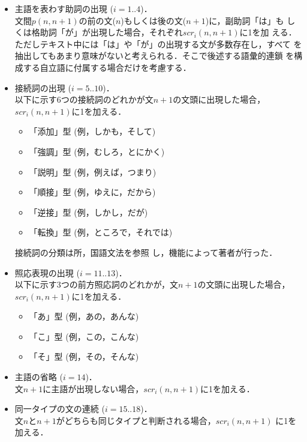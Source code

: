 \begin{itemize}
\item 主語を表わす助詞の出現 ($i=1..4$)．\\
	文間$p(n,n+1)$の前の文($n$)もしくは後の文($n+1$)に，副助詞「は」も
	しくは格助詞「が」が出現した場合，それぞれ$scr_{i}(n,n+1)$に1を加
	える．
	ただしテキスト中には「は」や「が」の出現する文が多数存在し，すべて
	を抽出してもあまり意味がないと考えられる．そこで後述する語彙的連鎖
	を構成する自立語に付属する場合だけを考慮する．

\item 接続詞の出現 ($i=5..10$)．\\
	以下に示す6つの接続詞のどれかが文$n+1$の文頭に出現した場合，
	$scr_{i}(n,n+1)$に1を加える．
	\begin{itemize}
	\item 「添加」型 (例，しかも，そして)
	\item 「強調」型 (例，むしろ，とにかく)
	\item 「説明」型 (例，例えば，つまり)
	\item 「順接」型 (例，ゆえに，だから)
	\item 「逆接」型 (例，しかし，だが)
	\item 「転換」型 (例，ところで，それでは)
	\end{itemize}

	接続詞の分類は所\cite{tokoro}，国語文法\cite{kougobunpou}を参照
	し，機能によって著者が行った．

\item 照応表現の出現 ($i=11..13$)．\\
	以下に示す3つの前方照応詞のどれかが，文$n+1$の文頭に出現した場合，
	$scr_{i}(n,n+1)$に1を加える．

	\begin{itemize}
	\item 「あ」型 (例，あの，あんな)
	\item 「こ」型 (例，この，こんな)
	\item 「そ」型 (例，その，そんな)
	\end{itemize}

\item 主語の省略 ($i=14$)．\\
	文$n+1$に主語が出現しない場合，$scr_{i}(n,n+1)$に1を加える．

\item 同一タイプの文の連続 ($i=15..18$)．\\
	文$n$と$n+1$がどちらも同じタイプと判断される場合，$scr_{i}(n,n+1)$
	に1を加える．


\end{itemize}
